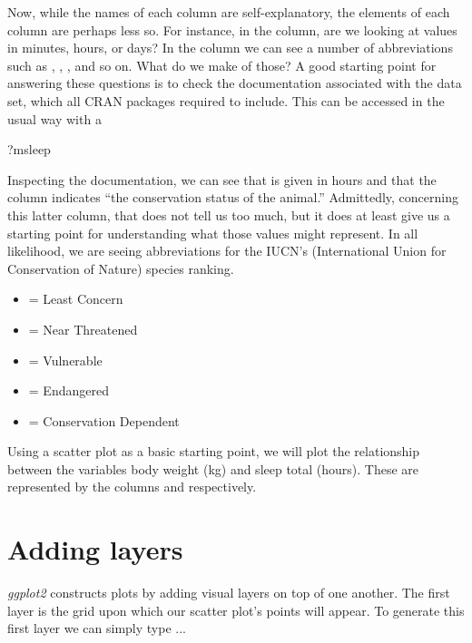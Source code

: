 Now, while the names of each column are self-explanatory, the elements of each column are perhaps less so.  For instance, in the  column, are we looking at values in minutes, hours, or days? In the  column we can see a number of abbreviations such as , , , and so on. What do we make of those? A good starting point for answering these questions is to check the documentation associated with the data set, which all CRAN packages required to include. This can be accessed in the usual way with a 

\begin{inR}
?msleep
\end{inR}
\vspace{1em}

\noindent
Inspecting the documentation, we can see that  is given in hours and that the column  indicates ``the conservation status of the animal.''  Admittedly, concerning this latter column, that does not tell us too much, but it does at least give us a starting point for understanding what those values might represent.  In all likelihood, we are seeing abbreviations for the IUCN's (International Union for Conservation of Nature) species ranking. 

\begin{itemize}
\setlength\itemsep{-1em}
    \item {} = Least Concern
    \item {} = Near Threatened
    \item {} = Vulnerable
    \item {} = Endangered
    \item {} = Conservation Dependent
\end{itemize}

Using a \gls{scatter plot} as a basic starting point, we will plot the relationship between the variables body weight (kg) and sleep total (hours).  These are represented by the columns  and  respectively. 

\section{Adding layers}

\textit{ggplot2} constructs plots by adding visual layers on top of one another. The first layer is the grid upon which our scatter plot's points will appear.  To generate this first layer we can simply type ...

